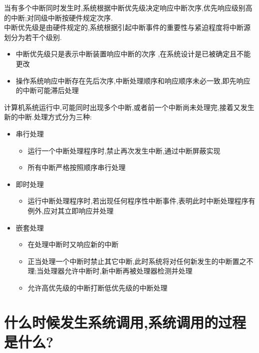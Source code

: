 \documentclass[a4paper,12pt,notitlepage]{article}
\begin{document}
	当有多个中断同时发生时,系统根据中断优先级决定响应中断次序,优先响应级别高的中断;对同级中断按硬件规定次序. \\
	
	中断优先级是由硬件规定的,系统根据引起中断事件的重要性与紧迫程度将中断源划分为若干个级别. \\
	
\begin{itemize}
	\item 中断优先级只是表示中断装置响应中断的次序 ,在系统设计是已被确定且不能更改
	\item 操作系统响应中断存在先后次序,中断处理顺序和响应顺序未必一致,即先响应的中断可能滞后处理
\end{itemize}
	
	计算机系统运行中,可能同时出现多个中断,或者前一个中断尚未处理完,接着又发生新的中断.处理方式分为三种: \\
	
\begin{itemize}
	\item 串行处理
	\begin{itemize}
		\item 运行一个中断处理程序时,禁止再次发生中断,通过中断屏蔽实现 \\
		\item 所有中断严格按照顺序串行处理 \\
	\end{itemize}
	\item 即时处理
	\begin{itemize}
		\item 运行中断处理程序时,若出现任何程序性中断事件,表明此时中断处理程序有例外,应对其立即响应并处理
	\end{itemize}
	\item 嵌套处理
	\begin{itemize}
		\item 在处理中断时又响应新的中断
		\item 正当处理一个中断时禁止其它中断,此时系统将对任何新发生的中断置之不理;当处理器允许中断时,新中断再被处理器检测并处理
		\item 允许高优先级的中断打断低优先级的中断处理
	\end{itemize}
\end{itemize}	

\section{什么时候发生系统调用,系统调用的过程是什么?}
\end{document}
